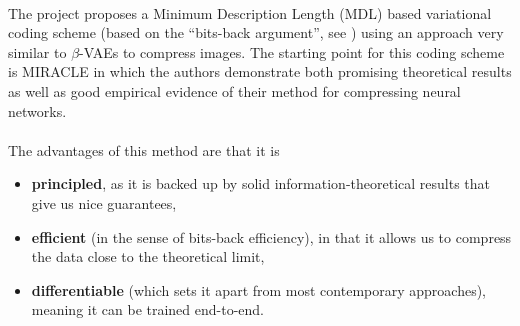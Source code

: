 \documentclass{article}
\newcommand{\KL}{\mathrm{KL}}
\newcommand{\D}{\mathcal{D}}
\newcommand{\Exp}{\mathbb{E}}
\newcommand{\M}{\mathcal{M}}
\newcommand{\Oh}{\mathcal{O}}
\renewcommand{\vec}[1]{\mathbf{#1}}
\begin{document}
\paragraph{}
The project proposes a Minimum Description Length (MDL) based variational coding scheme
(based on the ``bits-back argument'', see \cite{hinton1993keeping}) using an
approach very similar to $\beta$-VAEs \cite{higgins2017beta} 
to compress images. The starting point for this coding scheme is MIRACLE
\cite{havasi2018minimal} in which the authors demonstrate both promising
theoretical results as well as good empirical evidence of their method for
compressing neural networks.\\\\
The advantages of this method are that it is
\begin{itemize}
\item \textbf{principled}, as it is backed up by solid information-theoretical results
  that give us nice guarantees,
\item \textbf{efficient} (in the sense of bits-back efficiency), in that it allows us to
  compress the data close to the theoretical limit,
\item \textbf{differentiable} (which sets it apart from most contemporary approaches),
  meaning it can be trained end-to-end.
\end{itemize}
\end{document}
